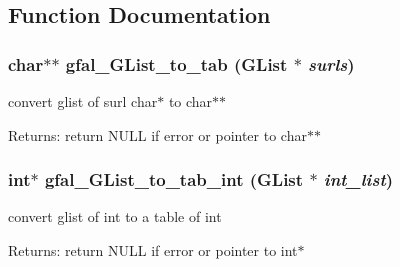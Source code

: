 \subsection{Function Documentation}
\subsubsection{\setlength{\rightskip}{0pt plus 5cm}char$\ast$$\ast$ gfal\_\-GList\_\-to\_\-tab (GList $\ast$ {\em surls})}\label{gfal__common__internal_8h_a7e1120eb32c4c7f293f6fbcb4f0ea33}


convert glist of surl char$\ast$ to char$\ast$$\ast$ 

\begin{Desc}
\item[Returns:]return NULL if error or pointer to char$\ast$$\ast$ \end{Desc}
\subsubsection{\setlength{\rightskip}{0pt plus 5cm}int$\ast$ gfal\_\-GList\_\-to\_\-tab\_\-int (GList $\ast$ {\em int\_\-list})}\label{gfal__common__internal_8h_87219c9e2c6323b67c2ac70354ee2645}


convert glist of int to a table of int 

\begin{Desc}
\item[Returns:]return NULL if error or pointer to int$\ast$ \end{Desc}
